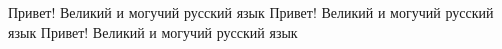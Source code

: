 \documentclass[12pt]{article}
\begin{document}
\vspace*{\fill} \vspace*{-5ex}
Привет! Великий и могучий русский язык Привет! Великий и могучий русский язык Привет! Великий и могучий русский язык 
\vspace*{\fill} 
\end{document}
